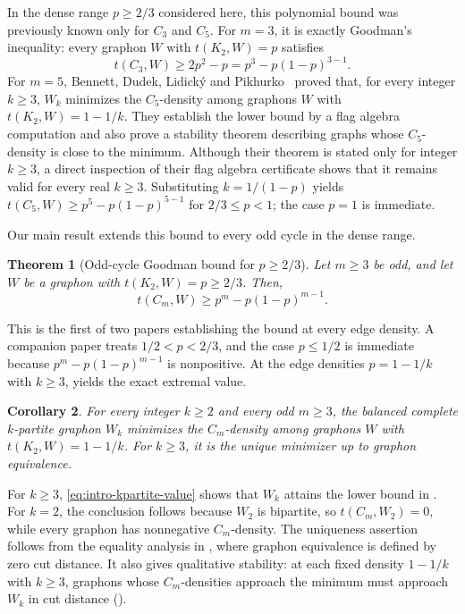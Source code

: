 \documentclass[11pt]{article}
\newtheorem{theorem}{Theorem}[section]
\newtheorem{corollary}[theorem]{Corollary}
\numberwithin{equation}{section}
\newcommand{\tC}[2]{t(C_{#1},#2)}
\newcommand{\edens}[1]{t(K_{2},#1)}
\newcommand{\goodman}[2]{#1^{#2}-#1(1-#1)^{#2-1}}
\newcommand{\goal}{\goodman{p}{m}}
\begin{document}
In the dense range $p\ge2/3$ considered here, this polynomial bound was previously known only for $C_3$ and $C_5$.
For $m=3$, it is exactly Goodman's inequality: every graphon $W$ with $\edens W=p$ satisfies
\begin{equation}\label{eq:intro-goodman}
  \tC3W\ge2p^2-p=\goodman p3.
\end{equation}
For $m=5$, Bennett, Dudek, Lidick\'y and Pikhurko~\cite{bennett2020minimizing} proved that, for every integer $k\ge3$, $W_k$ minimizes the $C_5$-density among graphons $W$ with $\edens W=1-1/k$.
They establish the lower bound by a flag algebra computation and also prove a stability theorem describing graphs whose $C_5$-density is close to the minimum.
Although their theorem is stated only for integer $k\ge3$, a direct inspection of their flag algebra certificate shows that it remains valid for every real $k\ge3$.
Substituting $k=1/(1-p)$ yields $\tC5W\ge\goodman p5$ for $2/3\le p<1$; the case $p=1$ is immediate.

Our main result extends this bound to every odd cycle in the dense range.

\begin{theorem}[Odd-cycle Goodman bound for $p\ge2/3$]\label{thm:main}
  Let $m\ge3$ be odd, and let $W$ be a graphon with $\edens W=p\ge2/3$.
  Then,
  \begin{equation}\label{eq:intro-main}
    \tC mW\ge\goal.
  \end{equation}
\end{theorem}

This is the first of two papers establishing the bound at every edge density.
A companion paper treats $1/2<p<2/3$, and the case $p\le1/2$ is immediate because $p^m-p(1-p)^{m-1}$ is nonpositive.
At the edge densities $p=1-1/k$ with $k\ge3$,  yields the exact extremal value.

\begin{corollary}\label{cor:kpartite}
  For every integer $k\ge2$ and every odd $m\ge3$, the balanced complete $k$-partite graphon $W_k$ minimizes the $C_m$-density among graphons $W$ with $\edens W=1-1/k$.
  For $k\ge3$, it is the unique minimizer up to graphon equivalence.
\end{corollary}

For $k\ge3$, \eqref{eq:intro-kpartite-value} shows that $W_k$ attains the lower bound in .
For $k=2$, the conclusion follows because $W_2$ is bipartite, so $\tC m{W_2}=0$, while every graphon has nonnegative $C_m$-density.
The uniqueness assertion follows from the equality analysis in , where graphon equivalence is defined by zero cut distance.
It also gives qualitative stability: at each fixed density $1-1/k$ with $k\ge3$, graphons whose $C_m$-densities approach the minimum must approach $W_k$ in cut distance ().
\end{document}
